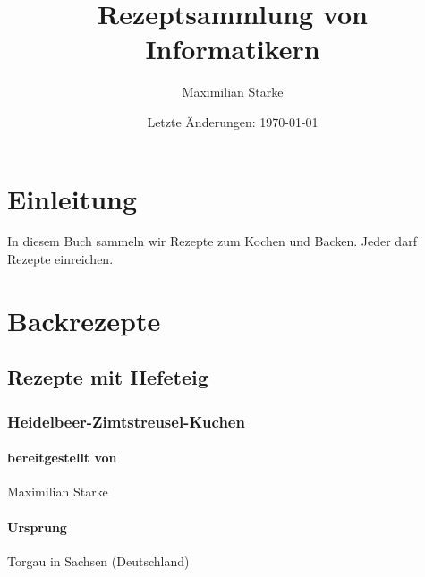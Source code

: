\documentclass[a4paper]{book}
\title{Rezeptsammlung von Informatikern}
\date{Letzte Änderungen: \today}
\author{Maximilian Starke}
\begin{document}
\maketitle
\tableofcontents

\chapter*{Einleitung}

In diesem Buch sammeln wir Rezepte zum Kochen und Backen.
Jeder darf Rezepte einreichen. 

\chapter{Backrezepte}

\section{Rezepte mit Hefeteig}

\newpage
\subsection{Heidelbeer-Zimtstreusel-Kuchen}

\subsubsection{bereitgestellt von}
	Maximilian Starke
\subsubsection{Ursprung}
	Torgau in Sachsen (Deutschland)
\end{document}
